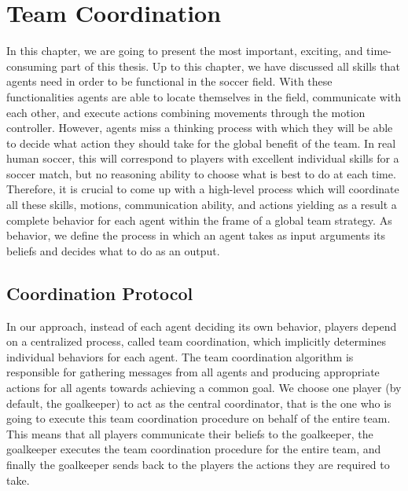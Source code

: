 \chapter{Team Coordination}
\label{Coordination}

In this chapter, we are going to present the most important, exciting, and time-consuming part of this thesis. Up to this chapter, we have discussed all skills that agents need in order to be functional in the soccer field. With these functionalities agents are able to locate themselves in the field, communicate with each other, and execute actions combining movements through the motion controller. However, agents miss a thinking process with which they will be able to decide what action they should take for the global benefit of the team. In real human soccer, this will correspond to players with excellent individual skills for a soccer match, but no reasoning ability to choose what is best to do at each time. Therefore, it is crucial to come up with a high-level process which will coordinate all these skills, motions, communication ability, and actions yielding as a result a complete behavior for each agent within the frame of a global team strategy. As behavior, we define the process in which an agent takes as input arguments its beliefs and decides what to do as an output. 

\section{Coordination Protocol}

In our approach, instead of each agent deciding its own behavior, players depend on a centralized process, called team coordination, which implicitly determines individual behaviors for each agent.  The team coordination algorithm is responsible for gathering messages from all agents and producing appropriate actions for all agents towards achieving a common goal. We choose one player (by default, the goalkeeper) to act as the central coordinator, that is the one who is going to execute this team coordination procedure on behalf of the entire team. This means that all players communicate their beliefs to the goalkeeper, the goalkeeper executes the team coordination procedure for the entire team, and finally the goalkeeper sends back to the players the actions they are required to take.


